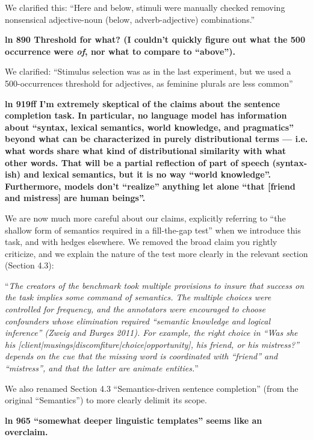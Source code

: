 \documentclass{article}[11pt,a4paper,oneside]
\begin{document}
We clarified this: ``Here and below, stimuli were manually checked removing nonsensical adjective-noun (below, adverb-adjective) combinations.''
\newline

\textbf{ln 890 Threshold for what? (I couldn't quickly figure out what the 500 occurrence were \emph{of}, nor what to compare to ``above'').}

We clarified: ``Stimulus selection was as in the last experiment, but we used a 500-occurrences threshold for adjectives, as feminine plurals are less common''
\newline

\textbf{ln 919ff I'm extremely skeptical of the claims about the sentence completion task. In particular, no language model has information about ``syntax, lexical semantics, world knowledge, and pragmatics'' beyond what can be characterized in purely distributional terms --- i.e. what words share what kind of distributional similarity with what other words. That will be a partial reflection of part of speech (syntax-ish) and lexical semantics, but it is no way ``world knowledge''. Furthermore, models don't ``realize'' anything let alone ``that [friend and mistress] are human beings''.}

We are now much more careful about our claims, explicitly referring to ``the shallow form of semantics required in a fill-the-gap test'' when we introduce this task, and with hedges elsewhere. We removed the broad claim you rightly criticize, and we explain the nature of the test more clearly in the relevant section (Section 4.3):

``\textit{The creators of the benchmark took multiple provisions to insure that success on the task implies some command of semantics. The multiple choices were controlled for frequency, and the annotators were encouraged to choose confounders whose elimination required ``semantic knowledge and logical inference'' (Zweig and Burges 2011).  For example, the right choice in ``Was she his [client|musings|discomfiture|choice|opportunity], his friend, or his mistress?'' depends on the cue that the missing word is coordinated with ``friend'' and ``mistress'', and that the latter are animate entities.}''

We also renamed Section 4.3 ``Semantics-driven sentence completion'' (from the original ``Semantics'') to more clearly delimit its scope.
\newline

\textbf{ln 965 ``somewhat deeper linguistic templates'' seems like an overclaim.}
\end{document}
